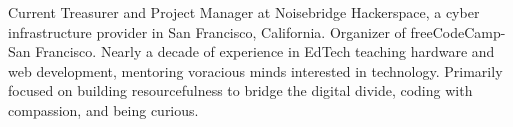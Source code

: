 

\begin{cvparagraph}

Current Treasurer and Project Manager at Noisebridge Hackerspace, a cyber infrastructure provider in San Francisco, California. Organizer of freeCodeCamp-San Francisco. Nearly a decade of experience in EdTech teaching hardware and web development, mentoring voracious minds interested in technology. Primarily focused on building resourcefulness to bridge the digital divide, coding with compassion, and being curious.
\end{cvparagraph}
